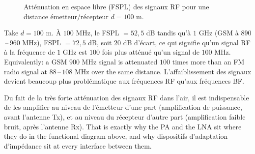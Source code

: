 \begin{figure}[h!]
  \centering
  \caption*{\small Atténuation en espace libre (FSPL) des signaux RF pour une
  distance émetteur/récepteur $d=100$ m.}
\end{figure}

\begin{example}
  Take $d = 100$ m. À $100$ MHz, le FSPL $=52{,}5$ dB tandis qu'à $1$ GHz (GSM à
  $890$\,--\,$960$ MHz), FSPL $=72{,}5$ dB, soit $20$ dB d'écart, ce qui
  signifie qu'un signal RF à la fréquence de $1$ GHz est $100$ fois plus
  atténué qu'un signal de $100$ MHz. Equivalently: a GSM $900$ MHz signal is
  attenuated $100$ times more than an FM radio signal at $88$\,--\,$108$ MHz
  over the same distance. L'affaiblissement des signaux devient beaucoup plus
  problématique aux fréquences RF qu'aux fréquences BF.
\end{example}

\begin{conclusion}
  Du fait de la très forte atténuation des signaux RF dans l'air, il est
  indispensable de les amplifier au niveau de l'émetteur d'une part
  (amplification de puissance, avant l'antenne Tx), et au niveau du récepteur
  d'autre part (amplification faible bruit, après l'antenne Rx).
  That is exactly why the PA and the LNA sit where they do in the functional
  diagram above, and why dispositifs d'adaptation d'impédance sit at every
  interface between them.
\end{conclusion}

